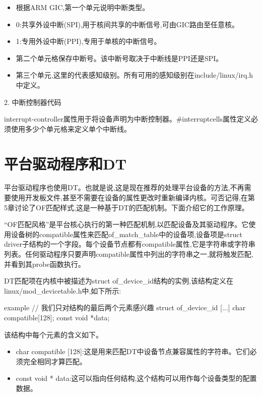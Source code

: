 \documentclass[lang=cn,newtx,10pt,scheme=chinese]{elegantbook}
\begin{document}
\begin{itemize}
    \item 根据ARM GIC,第一个单元说明中断类型。
    \item 0:共享外设中断(SPI),用于核间共享的中断信号,可由GIC路由至任意核。
    \item 1:专用外设中断(PPI),专用于单核的中断信号。
    \item 第二个单元格保存中断号。该中断号取决于中断线是PPI还是SPI。
    \item 第三个单元,这里的代表感知级别。所有可用的感知级别在include/linux/irq.h中定义。
\end{itemize}

2. 中断控制器代码

interrupt-controller属性用于将设备声明为中断控制器。\#interruptcells属性定义必须使用多少个单元格来定义单个中断线。

\section{平台驱动程序和DT}

平台驱动程序也使用DT。也就是说,这是现在推荐的处理平台设备的方法,不再需要使用开发板文件,甚至不需要在设备的属性更改时重新编译内核。可否记得,在第5章讨论了OF匹配样式,这是一种基于DT的匹配机制。下面介绍它的工作原理。

“OF匹配风格”是平台核心执行的第一种匹配机制,以匹配设备及其驱动程序。它使用设备树的compatible属性来匹配of\_match\_table中的设备项,设备项是struct driver子结构的一个字段。每个设备节点都有compatible属性,它是字符串或字符串列表。任何驱动程序只要声明compatible属性中列出的字符串之一,就将触发匹配,并看到其probe函数执行。

DT匹配项在内核中被描述为struct of\_device\_id结构的实例,该结构定义在linux/mod\_devicetable.h中,如下所示:

\begin{mycode}{example}
    // 我们只对结构的最后两个元素感兴趣
    struct of_device_id {
        [...]
        char compatible[128];
        const void *data;
    }
\end{mycode}

该结构中每个元素的含义如下。

\begin{itemize}
\item char compatible [128]:这是用来匹配DT中设备节点兼容属性的字符串。它们必须完全相同才算匹配。
\item const void * data:这可以指向任何结构,这个结构可以用作每个设备类型的配置数据。
\end{itemize}
\end{document}
